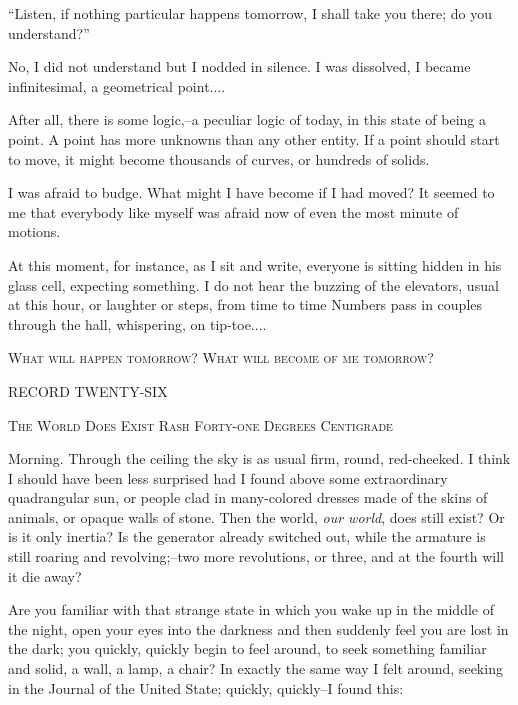 \documentclass[11pt,openany]{book}
\begin{document}
``Listen, if nothing particular happens tomorrow, I shall take you there; do you understand?''

No, I did not understand but I nodded in silence. I was dissolved, I became infinitesimal, a geometrical point....

After all, there is some logic,--a peculiar logic of today, in this state of being a point. A point has more unknowns than any other entity. If a point should start to move, it might become thousands of curves, or hundreds of solids.

I was afraid to budge. What might I have become if I had moved? It seemed to me that everybody like myself was afraid now of even the most minute of motions.

At this moment, for instance, as I sit and write, everyone is sitting hidden in his glass cell, expecting something. I do not hear the buzzing of the elevators, usual at this hour, or laughter or steps, from time to time Numbers pass in couples through the hall, whispering, on tip-toe....

\begin{center}\textsc{What will happen tomorrow? What will become of me tomorrow?}\end{center}

\begin{center}\textsc{RECORD TWENTY-SIX}\end{center}

\begin{center}\textsc{The World Does Exist Rash Forty-one Degrees Centigrade}\end{center}

Morning. Through the ceiling the sky is as usual firm, round, red-cheeked. I think I should have been less surprised had I found above some extraordinary quadrangular sun, or people clad in many-colored dresses made of the skins of animals, or opaque walls of stone. Then the world, \emph{our world}, does still exist? Or is it only inertia? Is the generator already switched out, while the armature is still roaring and revolving;--two more revolutions, or three, and at the fourth will it die away?

Are you familiar with that strange state in which you wake up in the middle of the night, open your eyes into the darkness and then suddenly feel you are lost in the dark; you quickly, quickly begin to feel around, to seek something familiar and solid, a wall, a lamp, a chair? In exactly the same way I felt around, seeking in the Journal of the United State; quickly, quickly--I found this:
\end{document}
